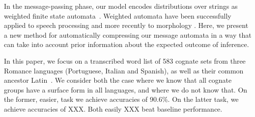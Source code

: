 \documentclass[11pt,a4paper]{article}
\begin{document}
In the message-passing phase, our model encodes distributions over
strings as weighted finite state automata~\cite{mohri09weighted}.
Weighted automata have been successfully applied to speech processing
\cite{Mohri96weightedautomata} and more recently to morphology
\cite{dreyer2009graphical}.  Here, we present a new method for
automatically compressing our message automata in a way that can
take into account prior information about the expected outcome of
inference.


In this paper, we focus on a transcribed word list of 583 cognate
sets from three Romance languages (Portuguese, Italian and Spanish),
as well as their common ancestor Latin~\cite{bouchard07probabilistic}.
We consider both the case where we know that all cognate groups have a
surface form in all languages, and where we do not know that.  On
the former, easier, task we achieve accuracies of 90.6\%. On the
latter task, we achieve accuracies of XXX. Both easily XXX beat
baseline performance.

\end{document}
